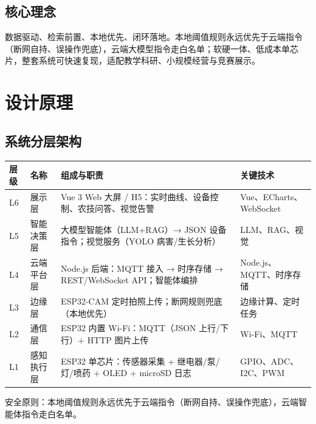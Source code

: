 ﻿\documentclass[11pt]{ctexart}
\begin{document}
\subsection{核心理念}
数据驱动、检索前置、本地优先、闭环落地。本地阈值规则永远优先于云端指令（断网自持、误操作兜底），云端大模型指令走白名单；软硬一体、低成本单芯片，整套系统可快速复现，适配教学科研、小规模经营与竞赛展示。

\section{设计原理}
\subsection{系统分层架构}
\begin{longtable}{p{1.2cm}p{2.2cm}p{8.8cm}p{3.0cm}}
  \toprule
  层级 & 名称 & 组成与职责 & 关键技术 \\
  \midrule
  L6 & 展示层 & Vue 3 Web 大屏 / H5：实时曲线、设备控制、农技问答、视觉告警 & Vue、ECharts、WebSocket \\
  L5 & 智能决策层 & 大模型智能体（LLM+RAG）→ JSON 设备指令；视觉服务（YOLO 病害/生长分析） & LLM、RAG、视觉 \\
  L4 & 云端平台层 & Node.js 后端：MQTT 接入 → 时序存储 → REST/WebSocket API；智能体编排 & Node.js、MQTT、时序存储 \\
  L3 & 边缘层 & ESP32-CAM 定时拍照上传；断网规则兜底（本地优先） & 边缘计算、定时任务 \\
  L2 & 通信层 & ESP32 内置 Wi-Fi：MQTT（JSON 上行/下行）+ HTTP 图片上传 & Wi-Fi、MQTT \\
  L1 & 感知执行层 & ESP32 单芯片：传感器采集 + 继电器/泵/灯/喷药 + OLED + microSD 日志 & GPIO、ADC、I2C、PWM \\
  \bottomrule
\end{longtable}
安全原则：本地阈值规则永远优先于云端指令（断网自持、误操作兜底），云端智能体指令走白名单。
\end{document}
